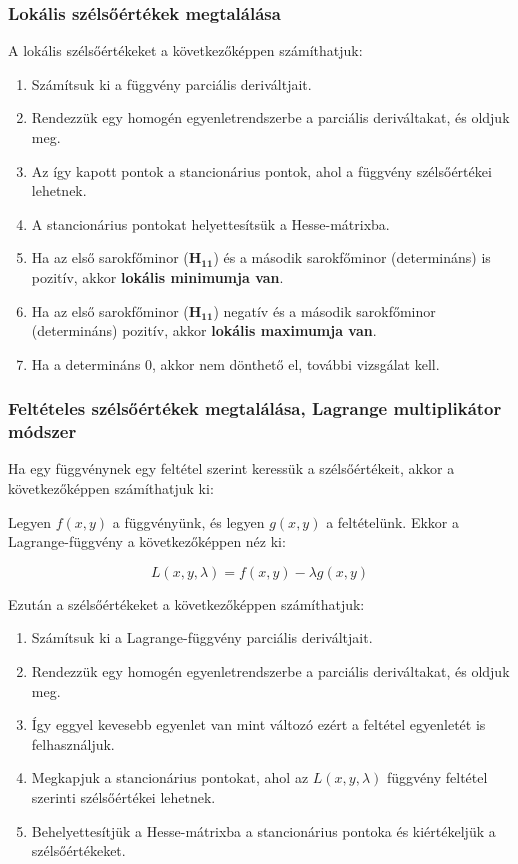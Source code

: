 \documentclass{article}
\begin{document}
\subsubsection{Lokális szélsőértékek megtalálása}

A lokális szélsőértékeket a következőképpen számíthatjuk:

\begin{enumerate}
    \item Számítsuk ki a függvény parciális deriváltjait.
    \item Rendezzük egy homogén egyenletrendszerbe a parciális deriváltakat, és oldjuk meg.
    \item Az így kapott pontok a stancionárius pontok, ahol a függvény szélsőértékei lehetnek.
    \item A stancionárius pontokat helyettesítsük a Hesse-mátrixba.
    \item Ha az első sarokfőminor ($\mathbf{H_{11}}$) és a második sarokfőminor (determináns) is pozitív, akkor \textbf{lokális minimumja van}.
    \item Ha az első sarokfőminor ($\mathbf{H_{11}}$) negatív és a második sarokfőminor (determináns) pozitív, akkor \textbf{lokális maximumja van}.
    \item Ha a determináns 0, akkor nem dönthető el, további vizsgálat kell.
\end{enumerate}

\subsubsection{Feltételes szélsőértékek megtalálása, Lagrange multiplikátor módszer}

Ha egy függvénynek egy feltétel szerint ke\-res\-sük a szél\-ső\-ér\-ték\-e\-it, ak\-kor a kö\-vet\-ke\-ző\-kép\-pen szá\-mít\-hat\-juk ki:

Legyen $f(x, y)$ a függvényünk, és legyen $g(x, y)$ a feltételünk. Ekkor a Lagrange-függvény a következőképpen néz ki:

\begin{equation*}
    L(x, y, \lambda) = f(x, y) - \lambda g(x, y)
\end{equation*}

Ezután a szélsőértékeket a következőképpen számíthatjuk:

\begin{enumerate}
    \item Számítsuk ki a Lagrange-függvény parciális deriváltjait.
    \item Rendezzük egy homogén egyenletrendszerbe a parciális deriváltakat, és oldjuk meg.
    \item Így eggyel kevesebb egyenlet van mint változó ezért a feltétel egyenletét is felhasználjuk.
    \item Megkapjuk a stancionárius pontokat, ahol az $L(x, y, \lambda)$ függvény feltétel szerinti szélsőértékei lehetnek.
    \item Behelyettesítjük a Hesse-mátrixba a stancionárius pontoka és kiértékeljük a szélsőértékeket.
\end{enumerate}
\end{document}
